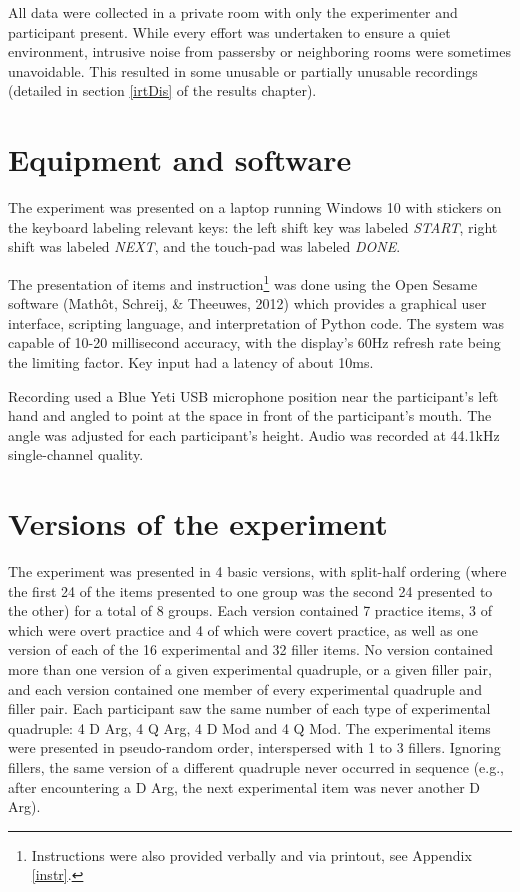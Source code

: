 \documentclass[12pt,oneside]{book}
\let\rmarkdownfootnote\footnote%
\def\footnote{\protect\rmarkdownfootnote}
\begin{document}
All data were collected in a private room with only the experimenter and participant present. While every effort was undertaken to ensure a quiet environment, intrusive noise from passersby or neighboring rooms were sometimes unavoidable. This resulted in some unusable or partially unusable recordings (detailed in section \ref{irtDis} of the results chapter).

\hypertarget{equipment-and-software}{%
\section{Equipment and software}\label{equipment-and-software}}

The experiment was presented on a laptop running Windows 10 with stickers on the keyboard labeling relevant keys: the left shift key was labeled \emph{START}, right shift was labeled \emph{NEXT}, and the touch-pad was labeled \emph{DONE}.

The presentation of items and instruction\footnote{Instructions were also provided verbally and via printout, see Appendix \ref{instr}.} was done using the Open Sesame software (Mathôt, Schreij, \& Theeuwes, 2012) which provides a graphical user interface, scripting language, and interpretation of Python code. The system was capable of 10-20 millisecond accuracy, with the display's 60Hz refresh rate being the limiting factor. Key input had a latency of about 10ms.

Recording used a Blue Yeti USB microphone position near the participant's left hand and angled to point at the space in front of the participant's mouth. The angle was adjusted for each participant's height. Audio was recorded at 44.1kHz single-channel quality.

\hypertarget{versions-of-the-experiment}{%
\section{Versions of the experiment}\label{versions-of-the-experiment}}

The experiment was presented in 4 basic versions, with split-half ordering (where the first 24 of the items presented to one group was the second 24 presented to the other) for a total of 8 groups. Each version contained 7 practice items, 3 of which were overt practice and 4 of which were covert practice, as well as one version of each of the 16 experimental and 32 filler items. No version contained more than one version of a given experimental quadruple, or a given filler pair, and each version contained one member of every experimental quadruple and filler pair. Each participant saw the same number of each type of experimental quadruple: 4 D Arg, 4 Q Arg, 4 D Mod and 4 Q Mod. The experimental items were presented in pseudo-random order, interspersed with 1 to 3 fillers. Ignoring fillers, the same version of a different quadruple never occurred in sequence (e.g., after encountering a D Arg, the next experimental item was never another D Arg).
\end{document}
